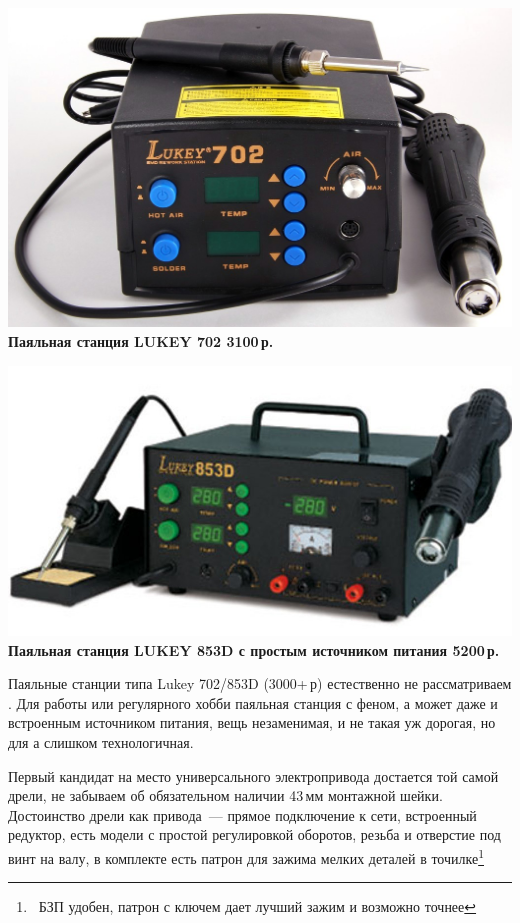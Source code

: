 \documentclass{magazine}
\begin{document}
\begin{multicols}{2}
\noindent\href{http://voltmaster-samara.ru/catalog/product/00073444/}{
\includegraphics[width=\columnwidth]{fig/00/Lukey702.jpg}}
\textbf{Паяльная станция LUKEY 702 3100\,р.}

\noindent\href{http://shop.siriust.ru/product\_info.php/cPath/23\_28\_269/products\_id/15290}{
\includegraphics[width=\columnwidth]{fig/00/Lukey853D.jpg}}
\textbf{Паяльная станция LUKEY 853D с простым источником питания 5200\,р.}

Паяльные станции типа Lukey 702/853D (3000+\,р) естественно не рассматриваем
\smiley. Для работы или регулярного хобби паяльная станция с феном, а может даже
и встроенным источником питания, вещь незаменимая, и не такая уж дорогая, но для
\scr а слишком технологичная.

\bigskip

Первый кандидат на место универсального электропривода достается той
самой дрели, не забываем об обязательном наличии 43\,мм монтажной шейки.
Достоинство дрели как привода\ --- прямое подключение к сети, встроенный
редуктор, есть модели с простой регулировкой оборотов, резьба и отверстие под
винт на валу, в комплекте есть патрон для зажима мелких деталей в
точилке\footnote{\ БЗП удобен, патрон с ключем дает лучший зажим и возможно
точнее}


\end{multicols}
\end{document}
